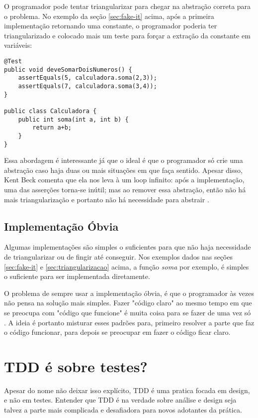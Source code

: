 O programador pode tentar triangularizar para chegar na abstração correta para o problema. No exemplo da seção \ref{sec:fake-it} acima, 
após a primeira implementação retornando uma constante, o programador poderia ter triangularizado e colocado mais um teste para
forçar a extração da constante em variáveis:

\begin{lstlisting}[frame=trbl]
@Test
public void deveSomarDoisNumeros() {
	assertEquals(5, calculadora.soma(2,3));
	assertEquals(7, calculadora.soma(3,4));
}

public class Calculadora {
	public int soma(int a, int b) {
		return a+b;
	}
}
\end{lstlisting}

Essa abordagem é interessante já que o ideal é que o programador só crie uma abstração caso haja duas ou mais situações em que
faça sentido. Apesar disso, Kent Beck comenta que ela nos leva à um loop infinito: após a implementação, uma das asserções torna-se
inútil; mas ao remover essa abstração, então não há mais triangularização e portanto não há necessidade para abstrair \cite{TDDByExample}.

\subsection{Implementação Óbvia}

Algumas implementações são simples o suficientes para que não haja necessidade de triangularizar ou de fingir até conseguir. Nos exemplos
dados nas seções \ref{sec:fake-it} e \ref{sec:triangularizacao} acima, a função \textit{soma} por exemplo, é simples o suficiente para
ser implementada diretamente.

O problema de sempre usar a implementação óbvia, é que o programador às vezes não pensa na solução mais simples. Fazer "código claro" ao
mesmo tempo em que se preocupa com "código que funcione" é muita coisa para se fazer de uma vez só \cite{TDDByExample}. A ideia é portanto
misturar esses padrões para, primeiro resolver a parte que faz o código funcionar, para depois se preocupar em fazer o código ficar claro.

\section{TDD é sobre testes?}
\label{sec:tdd-e-design}

Apesar do nome não deixar isso explícito, TDD é uma pratica focada em design, e não em testes.
Entender que TDD é na verdade sobre análise e design seja talvez a parte mais complicada e desafiadora para novos adotantes da prática. 

